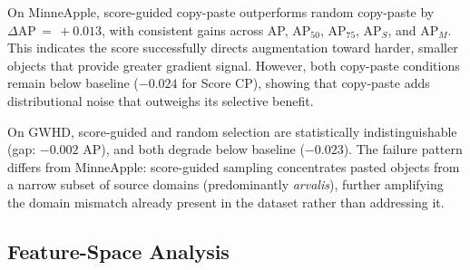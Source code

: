 \documentclass[conference]{IEEEtran}
\begin{document}
\begin{table}[t]
\centering
\caption{3-seed mean COCO AP on original test sets.
Bold = best copy-paste condition per dataset.}
\label{tab:results}
\end{table}

On MinneApple, score-guided copy-paste outperforms random
copy-paste by $\Delta\mathrm{AP}\,{=}\,{+}0.013$,
with consistent gains across AP, AP$_{50}$, AP$_{75}$,
AP$_S$, and AP$_M$. This indicates the score successfully
directs augmentation toward harder, smaller objects that
provide greater gradient signal. However, both copy-paste
conditions remain below baseline ($-0.024$ for Score CP),
showing that copy-paste adds distributional noise that
outweighs its selective benefit.

On GWHD, score-guided and random selection are
statistically indistinguishable (gap: $-0.002$ AP),
and both degrade below baseline ($-0.023$). The failure
pattern differs from MinneApple: score-guided sampling
concentrates pasted objects from a narrow subset of
source domains (predominantly \textit{arvalis}), further
amplifying the domain mismatch already present in the
dataset rather than addressing it.

\subsection{Feature-Space Analysis}
\end{document}
